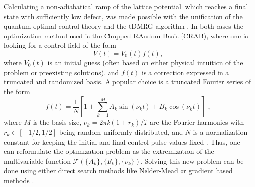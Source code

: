 Calculating a non-adiabatical ramp of the lattice potential, which reaches a final state with sufficiently low defect, was made possible with the unification of the quantum optimal control theory and the tDMRG algorithm \cite{Doria2011,FrankBloch}. In both cases the optimization method used is the Chopped RAndom Basis (CRAB), where one is looking for a control field of the form
\begin{equation}
	V(t) = V_0 (t) f(t),
\end{equation} 
where $V_0 (t)$ is an initial guess (often based on either physical intuition of the problem or preexisting solutions), and $f(t)$ is a correction expressed in a truncated and randomized basis. A popular choice is a truncated Fourier series of the form
\begin{equation}
	f(t) = \frac{1}{N} \left[ 1 + \sum_{k = 1}^{M} A_k \sin(\nu_k t) + B_k \cos(\nu_k t) \right] \; ,
\end{equation}
where $M$ is the basis size, $\nu_k = 2 \pi k (1 + r_k )/T$ are the Fourier harmonics with $r_k \in [-1/2 , 1/2]$ being random uniformly distributed, and $N$ is a normalization constant for keeping the initial and final control pulse values fixed \cite{Doria2011}. Thus, one can reformulate the optimization problem as the extremization of the multivariable function $\mathcal{F}(\{ A_k \}, \{ B_k \}, \{ \nu_k \})$. Solving this new problem can be done using either direct search methods like Nelder-Mead \cite{NumericalRecipes} or gradient based methods \cite{Winckel2008}.

